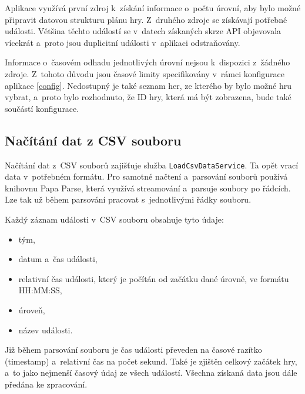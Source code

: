 \documentclass[
  digital, %
  oneside, %
  table,   %
  nolof,     %
  nolot,     %
  nocover
]{fithesis3}
\begin{document}
Aplikace využívá první zdroj k~získání informace o~počtu úrovní, aby bylo možné připravit datovou strukturu plánu hry. Z~druhého zdroje se získávají potřebné události. Většina těchto událostí se v~datech získaných skrze API objevovala vícekrát a~proto jsou duplicitní události v~aplikaci odstraňovány.\par
Informace o~časovém odhadu jednotlivých úrovní nejsou k~dispozici z~žádného zdroje. Z~tohoto důvodu jsou časové limity specifikovány v~rámci konfigurace aplikace \ref{config}. Nedostupný je také seznam her, ze kterého by bylo možné hru vybrat, a~proto bylo rozhodnuto, že ID hry, která má být zobrazena, bude také součástí konfigurace.\par

\subsection{Načítání dat z CSV souboru}
Načítání dat z~CSV souborů zajišťuje služba \verb|LoadCsvDataService|. Ta opět vrací data v~potřebném formátu. Pro samotné načtení a~parsování souborů používá knihovnu Papa Parse, která využívá streamování a~parsuje soubory po řádcích. Lze tak už během parsování pracovat s~jednotlivými řádky souboru.\par
Každý záznam události v~CSV souboru obsahuje tyto údaje:
\begin{itemize}
  \item tým, 
  \item datum a~čas události,
  \item relativní čas události, který je počítán od začátku dané úrovně, ve formátu HH:MM:SS,
  \item úroveň,
  \item název události.
\end{itemize}
Již během parsování souboru je čas události převeden na časové razítko (timestamp) a~relativní čas na počet sekund. Také je zjištěn celkový začátek hry, a~to jako nejmenší časový údaj ze všech událostí. Všechna získaná data jsou dále předána ke zpracování.
\end{document}
